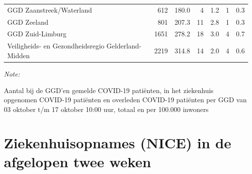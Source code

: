 \documentclass[
  english,
  man,floatsintext]{apa6}
\begin{document}
\begin{table}
\begin{threeparttable}
\begin{tabular}{lrrrrrr}
GGD Zaanstreek/Waterland & 612 & 180.0 & 4 & 1.2 & 1 & 0.3\\
GGD Zeeland & 801 & 207.3 & 11 & 2.8 & 1 & 0.3\\
GGD Zuid-Limburg & 1651 & 278.2 & 18 & 3.0 & 4 & 0.7\\
Veiligheids- en Gezondheidsregio Gelderland-Midden & 2219 & 314.8 & 14 & 2.0 & 4 & 0.6\\
\bottomrule
\end{tabular}
\begin{tablenotes}
\item \textit{Note: } 
\item Aantal bij de GGD’en gemelde COVID-19 patiënten, in het ziekenhuis opgenomen COVID-19 patiënten en overleden COVID-19 patiënten per GGD van 03 oktober t/m 17 oktober 10:00 uur, totaal en per 100.000 inwoners
\end{tablenotes}
\end{threeparttable}
\endgroup{}
\end{table}

\newpage

\hypertarget{ziekenhuisopnames-nice-in-de-afgelopen-twee-weken}{%
\section{Ziekenhuisopnames (NICE) in de afgelopen twee weken}\label{ziekenhuisopnames-nice-in-de-afgelopen-twee-weken}}
\end{document}
